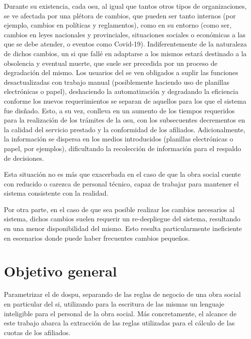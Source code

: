 
Durante su existencia, cada \acrfull{osu}, al igual que tantos otros tipos de organizaciones, se ve afectada por una plétora de cambios, que pueden ser tanto internos (por ejemplo, cambios en políticas y reglamentos), como en su entorno (como ser, cambios en leyes nacionales y provinciales, situaciones sociales o económicas a las que se debe atender, o eventos como Covid-19).
Indiferentemente de la naturaleza de dichos cambios, un \acrfull{si} que fallé en adaptarse a los mismos estará destinado a la obsolencia y eventual muerte, que suele ser precedida por un proceso de degradación del mismo.
Los usuarios del \SIOSU se ven obligados a suplir las funciones desactualizadas con trabajo manual (posiblemente haciendo uso de planillas electrónicas o papel), deshaciendo la automatización y degradando la eficiencia conforme los nuevos requerimientos se separan de aquellos para los que el sistema fue disñado.
Esto, a su vez, conlleva en un aumento de los tiempos requeridos para la realización de los trámites de la \acrshort{osu}, con los subsecuentes decrementos en la calidad del servicio prestado y la conformidad de los afiliados. Adicionalmente, la información se dispersa en los medios introducidos (planillas electrónicas o papel, por ejemplos), dificultando la recolección de información para el respaldo de decisiones.

Esta situación no es más que exacerbada en el caso de que la obra social cuente con reducido o carezca de personal técnico, capaz de trabajar para mantener el sistema consistente con la realidad.

Por otra parte, en el caso de que sea posible realizar los cambios necesarios al sistema, dichos cambios suelen requerir un re-despliegue del sistema, resultando en una menor disponibilidad del mismo. Esto resulta particularmente ineficiente en escenarios donde puede haber frecuentes cambios pequeños.

\section{Objetivo general}
Parametrizar el \SIOSU de \acrfull{dospu}, separando de las reglas de negocio de una obra social en particular del \acrshort{si}, utilizando para la escritura de las mismas un lenguaje inteligible para el personal de la obra social. Más concretamente, el alcance de este trabajo abarca la extracción de las reglas utilizadas para el cálculo de las cuotas de los afiliados.

